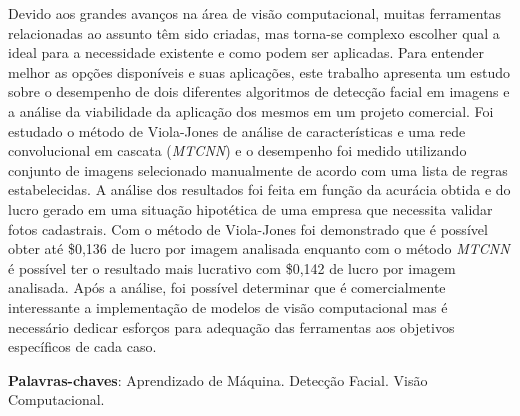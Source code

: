 
\setlength{\absparsep}{18pt} %
\begin{resumo}
  Devido aos grandes avanços na área de visão computacional, muitas ferramentas relacionadas ao assunto têm sido criadas, mas torna-se complexo escolher qual a ideal para a necessidade existente e como podem ser aplicadas. Para entender melhor as opções disponíveis e suas aplicações, este trabalho apresenta um estudo sobre o desempenho de dois diferentes algoritmos de detecção facial em imagens e a análise da viabilidade da aplicação dos mesmos em um projeto comercial. Foi estudado o método de Viola-Jones de análise de características e uma rede convolucional em cascata (\textit{MTCNN}) e o desempenho foi medido utilizando conjunto de imagens selecionado manualmente de acordo com uma lista de regras estabelecidas. A análise dos resultados foi feita em função da acurácia obtida e do lucro gerado em uma situação hipotética de uma empresa que necessita validar fotos cadastrais. Com o método de Viola-Jones foi demonstrado que é possível obter até \$0,136 de lucro por imagem analisada enquanto com o método \textit{MTCNN} é possível ter o resultado mais lucrativo com \$0,142 de lucro por imagem analisada. Após a análise, foi possível determinar que é comercialmente interessante a implementação de modelos de visão computacional mas é necessário dedicar esforços para adequação das ferramentas aos objetivos específicos de cada caso.

  \textbf{Palavras-chaves}: Aprendizado de Máquina. Detecção Facial. Visão Computacional.
\end{resumo}

